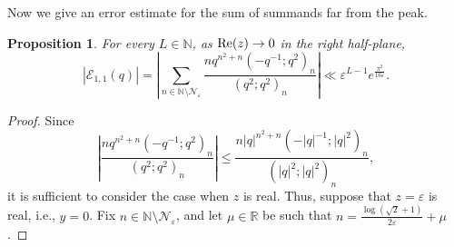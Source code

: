 \documentclass[11pt,reqno]{amsart}
\newtheorem{proposition}[theorem]{Proposition}
\theoremstyle{remark}
\numberwithin{equation}{section}
\renewcommand{\Re}{{\rm Re}}
\renewcommand{\Re}{{\rm Re}}
\begin{document}
Now we give an error estimate for the sum of summands far from the peak.
\begin{proposition}\label{prop:G_far}
	For every $L \in \mathbb{N}$, as $\Re(z) \to 0$ in the right half-plane, 
	\[
		\left| \mathcal{E}_{1,1}(q) \right| = \left|\sum_{n \in \mathbb{N} \setminus \mathcal{N}_{\varepsilon}}  \frac{ n q^{n^2+n} (-q^{-1};q^2)_n}{(q^2;q^2)_n} \right| \ll \varepsilon^{L-1} e^{\frac{\pi^2}{16\varepsilon}}.
	\]
\end{proposition}
\begin{proof}
Since
\[
	\left|  \frac{ n q^{n^2+n} (-q^{-1};q^2)_n}{(q^2;q^2)_n}\right| \leq  \frac{ n |q|^{n^2+n} (-|q|^{-1}; |q|^2)_n}{(|q|^2;|q|^2)_n}, 
\]
it is sufficient to consider the case when $z$ is real.
Thus, suppose that $z=\varepsilon$ is real, i.e., $y=0$. Fix $n \in \mathbb{N} \setminus \mathcal{N}_{\varepsilon}$, and let $\mu \in \mathbb{R}$ be such that $n = \frac{\log(\sqrt{2}+1)}{2\varepsilon}+\mu$. 



\end{proof}
\end{document}
